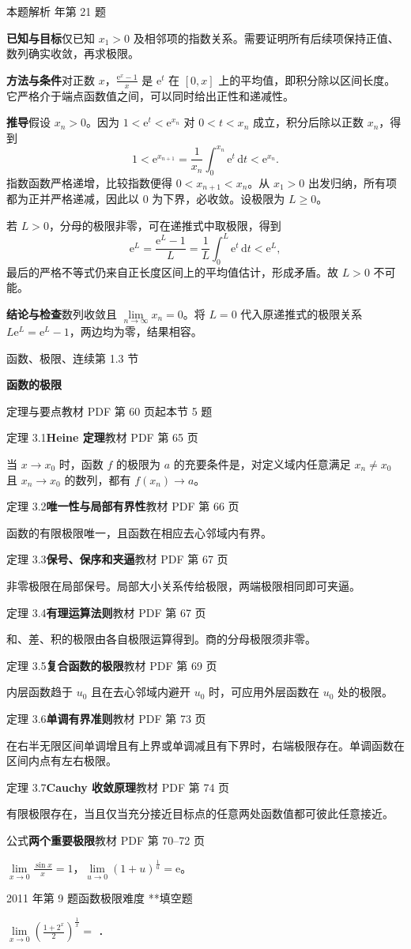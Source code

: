 \documentclass[UTF8,zihao=-4,fontset=fandol]{ctexart}
\renewcommand{\lim}{\operatorname*{lim}\limits}
\newcommand{\SectionHeading}[4]{%
  \clearpage\hypertarget{sec-#1}{}%
  {\small\textcolor{accent}{#2\hfill 第 #1 节}}\par\medskip
  {\LARGE\bfseries #3}\par\smallskip
  {\small\textcolor{muted}{#4}}\par\bigskip}
\newcommand{\Theory}[4]{%
  {\small\textcolor{accent}{#1}\quad\textbf{#3}\hfill\textcolor{muted}{教材 PDF 第 #2 页}}\par
  {\small #4}\par\smallskip}
\newcommand{\blank}{\underline{\hspace{5em}}}
\newcounter{BankQuestion}
\newcommand{\QuestionPage}[7]{%
  \stepcounter{BankQuestion}%
  \par\noindent\begin{minipage}{\linewidth}
  \raggedright
  {\small\textcolor{black!60}{#3\quad #5\quad 难度 #7}\hfill\textcolor{accent}{#2}}\par\smallskip}
\newcommand{\QuestionEnd}{\end{minipage}\par\medskip}
\newcommand{\QuestionPage}[7]{%
  \clearpage
  \stepcounter{BankQuestion}%
  {\small\textcolor{accent}{#1\hfill #2}}\par\medskip
  {\small\textcolor{black!60}{#3\quad #5\quad 难度 #7\hfill \arabic{BankQuestion} / 234}}\par\vspace{9bp}}
\newcommand{\QuestionEnd}{}
\newenvironment{QuestionSolution}[1]{%
  \clearpage
  {\small\textcolor{black!60}{本题解析\quad #1}}\par\medskip
}{\par\clearpage}
\begin{document}
\begin{QuestionSolution}{2018 年第 21 题}
\textbf{已知与目标}\quad 仅已知 \(x_1>0\) 及相邻项的指数关系。需要证明所有后续项保持正值、数列确实收敛，再求极限。

\textbf{方法与条件}\quad 对正数 \(x\)，\(\frac{\mathrm e^x-1}{x}\) 是 \(\mathrm e^t\) 在 \([0,x]\) 上的平均值，即积分除以区间长度。它严格介于端点函数值之间，可以同时给出正性和递减性。

\textbf{推导}\quad 假设 \(x_n>0\)。因为 \(1<\mathrm e^t<\mathrm e^{x_n}\) 对 \(0<t<x_n\) 成立，积分后除以正数 \(x_n\)，得到
\[
1<\mathrm{e}^{x_{n+1}}=\frac1{x_n}\int_0^{x_n}\mathrm{e}^t\,\mathrm{d}t<\mathrm{e}^{x_n}.
\]
指数函数严格递增，比较指数便得 \(0<x_{n+1}<x_n\)。从 \(x_1>0\) 出发归纳，所有项都为正并严格递减，因此以 \(0\) 为下界，必收敛。设极限为 \(L\ge0\)。

若 \(L>0\)，分母的极限非零，可在递推式中取极限，得到
\[
\mathrm e^L=\frac{\mathrm e^L-1}{L}
=\frac{1}{L}\int_0^L\mathrm e^t\,\mathrm{d}t<\mathrm e^L,
\]
最后的严格不等式仍来自正长度区间上的平均值估计，形成矛盾。故 \(L>0\) 不可能。

\textbf{结论与检查}\quad 数列收敛且 \(\boxed{\lim_{n\to\infty}x_n=0}\)。将 \(L=0\) 代入原递推式的极限关系 \(L\mathrm e^L=\mathrm e^L-1\)，两边均为零，结果相容。
\end{QuestionSolution}

\SectionHeading{1.3}{函数、极限、连续}{函数的极限}{定理与要点\quad 教材 PDF 第 60 页起\hfill 本节 5 题}
\Theory{定理 3.1}{65}{Heine 定理}{当 \(x\to x_0\) 时，函数 \(f\) 的极限为 \(a\) 的充要条件是，对定义域内任意满足 \(x_n\ne x_0\) 且 \(x_n\to x_0\) 的数列，都有 \(f(x_n)\to a\)。}
\Theory{定理 3.2}{66}{唯一性与局部有界性}{函数的有限极限唯一，且函数在相应去心邻域内有界。}
\Theory{定理 3.3}{67}{保号、保序和夹逼}{非零极限在局部保号。局部大小关系传给极限，两端极限相同即可夹逼。}
\Theory{定理 3.4}{67}{有理运算法则}{和、差、积的极限由各自极限运算得到。商的分母极限须非零。}
\Theory{定理 3.5}{69}{复合函数的极限}{内层函数趋于 \(u_0\) 且在去心邻域内避开 \(u_0\) 时，可应用外层函数在 \(u_0\) 处的极限。}
\Theory{定理 3.6}{73}{单调有界准则}{在右半无限区间单调增且有上界或单调减且有下界时，右端极限存在。单调函数在区间内点有左右极限。}
\Theory{定理 3.7}{74}{Cauchy 收敛原理}{有限极限存在，当且仅当充分接近目标点的任意两处函数值都可彼此任意接近。}
\Theory{公式}{70--72}{两个重要极限}{\(\lim_{x\to0}\frac{\sin x}{x}=1\)，\(\lim_{u\to0}(1+u)^{\frac{1}{u}}=\mathrm{e}\)。}
\QuestionPage{1.3 函数的极限}{填空题}{2011 年第 9 题}{1}{函数极限}{012 / 234}{**}
$\lim_{x \to 0} \left(\frac{1 + 2^x}{2} \right)^{\frac{1}{x}} =$ \blank{}．
\QuestionEnd
\end{document}
